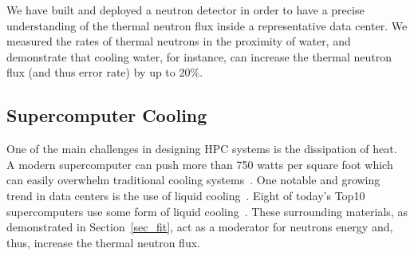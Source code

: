 We have built and deployed a neutron detector in order to have a precise understanding of the thermal neutron flux inside a representative data center. We measured the rates of thermal neutrons in the proximity of water, and demonstrate that cooling water, for instance, can increase the thermal neutron flux (and thus error rate) by up to 20\%. %


\subsection{Supercomputer Cooling}
\label{sec_cooling}

One of the main challenges in designing HPC systems is the dissipation of heat. A modern supercomputer can push more than 750 watts per square foot which can easily overwhelm traditional cooling systems~\cite{patterson2008state}.
%
%
One notable and growing trend in data centers is the use of 
liquid cooling~\cite{capozzoli2015cooling}. Eight of today's Top10
supercomputers use some form of liquid cooling~\cite{Dongarra2013}. 
These surrounding materials, as demonstrated in Section~\ref{sec_fit}, act as a moderator for neutrons energy and, thus, increase the thermal neutron flux.

